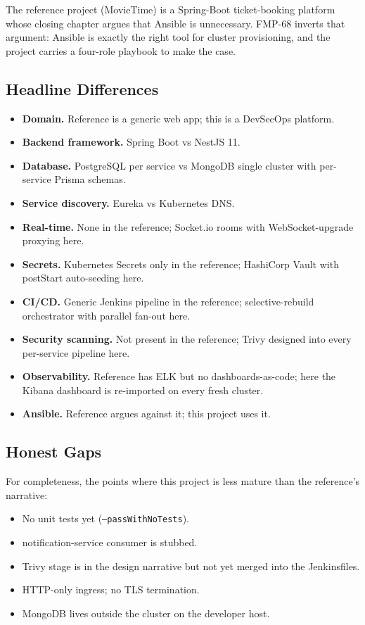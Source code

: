 \documentclass[11pt,a4paper]{article}
\begin{document}
The reference project (MovieTime) is a Spring-Boot ticket-booking
platform whose closing chapter argues that Ansible is unnecessary.
FMP-68 inverts that argument: Ansible is exactly the right tool for
cluster provisioning, and the project carries a four-role playbook
to make the case.

\subsection{Headline Differences}
\begin{itemize}[leftmargin=*]
  \item \textbf{Domain.}  Reference is a generic web app; this is a
        DevSecOps platform.
  \item \textbf{Backend framework.}  Spring Boot vs NestJS 11.
  \item \textbf{Database.}  PostgreSQL per service vs MongoDB
        single cluster with per-service Prisma schemas.
  \item \textbf{Service discovery.}  Eureka vs Kubernetes DNS.
  \item \textbf{Real-time.}  None in the reference; Socket.io rooms
        with WebSocket-upgrade proxying here.
  \item \textbf{Secrets.}  Kubernetes Secrets only in the reference;
        HashiCorp Vault with postStart auto-seeding here.
  \item \textbf{CI/CD.}  Generic Jenkins pipeline in the reference;
        selective-rebuild orchestrator with parallel fan-out here.
  \item \textbf{Security scanning.}  Not present in the reference;
        Trivy designed into every per-service pipeline here.
  \item \textbf{Observability.}  Reference has ELK but no
        dashboards-as-code; here the Kibana dashboard is re-imported
        on every fresh cluster.
  \item \textbf{Ansible.}  Reference argues against it; this project
        uses it.
\end{itemize}

\subsection{Honest Gaps}
For completeness, the points where this project is less mature than
the reference's narrative:

\begin{itemize}[leftmargin=*]
  \item No unit tests yet (\texttt{--passWithNoTests}).
  \item notification-service consumer is stubbed.
  \item Trivy stage is in the design narrative but not yet merged
        into the Jenkinsfiles.
  \item HTTP-only ingress; no TLS termination.
  \item MongoDB lives outside the cluster on the developer host.
\end{itemize}
\end{document}
